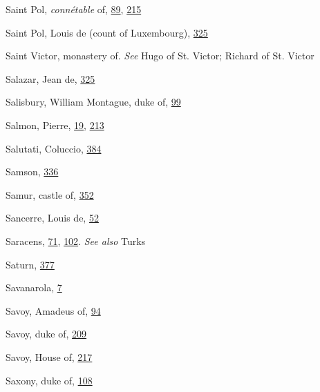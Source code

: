 Saint Pol, \emph{connétable} of,
\protect\hyperlink{10_Chapter_Three__THE_HEROIC_DREAM.xhtmlux5cux23page_89}{89},
\protect\hyperlink{14_Chapter_Seven__THE_PIOUS_PERSONA.xhtmlux5cux23page_215}{215}

Saint Pol, Louis de (count of Luxembourg),
\protect\hyperlink{20_ILLUSTRATIONS_FOLLOW_PAGE.xhtmlux5cux23page_325}{325}

Saint Victor, monastery of. \emph{See} Hugo of St. Victor; Richard of
St. Victor

Salazar, Jean de,
\protect\hyperlink{20_ILLUSTRATIONS_FOLLOW_PAGE.xhtmlux5cux23page_325}{325}

Salisbury, William Montague, duke of,
\protect\hyperlink{10_Chapter_Three__THE_HEROIC_DREAM.xhtmlux5cux23page_99}{99}

Salmon, Pierre,
\protect\hyperlink{08_Chapter_One__THE_PASSIONATE_INTE.xhtmlux5cux23page_19}{19},
\protect\hyperlink{14_Chapter_Seven__THE_PIOUS_PERSONA.xhtmlux5cux23page_213}{213}

Salutati, Coluccio,
\protect\hyperlink{22_Chapter_Fourteen__THE_COMING_OF.xhtmlux5cux23page_384}{384}

Samson,
\protect\hyperlink{21_Chapter_Thirteen__IMAGE_AND_WORD.xhtmlux5cux23page_336}{336}

Samur, castle of,
\protect\hyperlink{21_Chapter_Thirteen__IMAGE_AND_WORD.xhtmlux5cux23page_352}{352}

Sancerre, Louis de,
\protect\hyperlink{09_Chapter_Two__THE_CRAVING_FOR_A_M.xhtmlux5cux23page_52}{52}

Saracens,
\protect\hyperlink{10_Chapter_Three__THE_HEROIC_DREAM.xhtmlux5cux23page_71}{71},
\protect\hyperlink{10_Chapter_Three__THE_HEROIC_DREAM.xhtmlux5cux23page_102}{102}.
\emph{See also} Turks

Saturn,
\protect\hyperlink{21_Chapter_Thirteen__IMAGE_AND_WORD.xhtmlux5cux23page_377}{377}

Savanarola,
\protect\hyperlink{08_Chapter_One__THE_PASSIONATE_INTE.xhtmlux5cux23page_7}{7}

Savoy, Amadeus of,
\protect\hyperlink{10_Chapter_Three__THE_HEROIC_DREAM.xhtmlux5cux23page_94}{94}

Savoy, duke of,
\protect\hyperlink{14_Chapter_Seven__THE_PIOUS_PERSONA.xhtmlux5cux23page_209}{209}

Savoy, House of,
\protect\hyperlink{14_Chapter_Seven__THE_PIOUS_PERSONA.xhtmlux5cux23page_217}{217}

Saxony, duke of,
\protect\hyperlink{10_Chapter_Three__THE_HEROIC_DREAM.xhtmlux5cux23page_108}{108}


